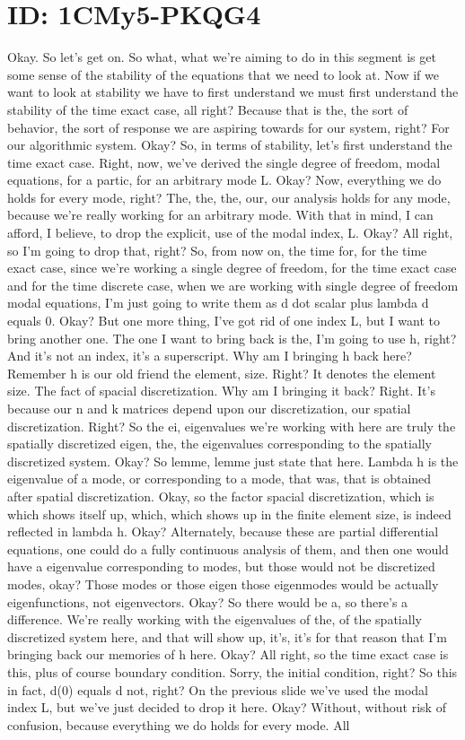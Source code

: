 \documentclass[10pt]{article}
\begin{document}
\section*{ID: 1CMy5-PKQG4}
Okay. So let's get on. So what, what we're aiming to do in this segment is get some sense of the stability of the equations that we need to look at. Now if we want to look at stability we have to first understand we must first understand the stability of the time exact case, all right? Because that is the, the sort of behavior, the sort of response we are aspiring towards for our system, right? For our algorithmic system. Okay? So, in terms of stability, let's first understand the time exact case. Right, now, we've derived the single degree of freedom, modal equations, for a partic, for an arbitrary mode L. Okay? Now, everything we do holds for every mode, right? The, the, the, our, our analysis holds for any mode, because we're really working for an arbitrary mode. With that in mind, I can afford, I believe, to drop the explicit, use of the modal index, L. Okay? All right, so I'm going to drop that, right? So, from now on, the time for, for the time exact case, since we're working a single degree of freedom, for the time exact case and for the time discrete case, when we are working with single degree of freedom modal equations, I'm just going to write them as d dot scalar plus lambda d equals 0. Okay? But one more thing, I've got rid of one index L, but I want to bring another one. The one I want to bring back is the, I'm going to use h, right? And it's not an index, it's a superscript. Why am I bringing h back here? Remember h is our old friend the element, size. Right? It denotes the element size. The fact of spacial discretization. Why am I bringing it back? Right. It's because our n and k matrices depend upon our discretization, our spatial discretization. Right? So the ei, eigenvalues we're working with here are truly the spatially discretized eigen, the, the eigenvalues corresponding to the spatially discretized system. Okay? So lemme, lemme just state that here. Lambda h is the eigenvalue of a mode, or corresponding to a mode, that was, that is obtained after spatial discretization. Okay, so the factor spacial discretization, which is which shows itself up, which, which shows up in the finite element size, is indeed reflected in lambda h. Okay? Alternately, because these are partial differential equations, one could do a fully continuous analysis of them, and then one would have a eigenvalue corresponding to modes, but those would not be discretized modes, okay? Those modes or those eigen those eigenmodes would be actually eigenfunctions, not eigenvectors. Okay? So there would be a, so there's a difference. We're really working with the eigenvalues of the, of the spatially discretized system here, and that will show up, it's, it's for that reason that I'm bringing back our memories of h here. Okay? All right, so the time exact case is this, plus of course boundary condition. Sorry, the initial condition, right? So this in fact, d(0) equals d not, right? On the previous slide we've used the modal index L, but we've just decided to drop it here. Okay? Without, without risk of confusion, because everything we do holds for every mode. All 
\end{document}
